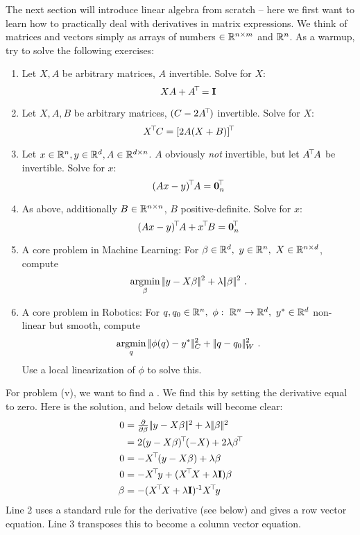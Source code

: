 The next section will introduce linear algebra from scratch -- here we first want to learn how to practically deal with derivatives in matrix expressions. We think of matrices and vectors simply as arrays of numbers $\in {\mathbb{R}}^{n\times m}$ and ${\mathbb{R}}^n$. As a warmup, try to solve the following exercises:
\begin{enumerate}
\item Let $X,A$ be arbitrary matrices, $A$ invertible. Solve for $X$:
\begin{equation}
 X A + A^{\!\top\!} = {\rm\bf I} 
\end{equation}

\item Let $X,A,B$ be arbitrary matrices, $(C-2A^{\!\top\!})$ invertible. Solve for $X$:
\begin{equation}
 X^{\!\top\!} C = [2 A (X + B)]^{\!\top\!} 
\end{equation}

\item Let $x\in{\mathbb{R}}^n,y\in{\mathbb{R}}^d,A\in{\mathbb{R}}^{d\times n}$. $A$ obviously \emph{not}
invertible, but let $A^{\!\top\!} A$ be invertible. Solve for $x$:
\begin{equation}
 (A x - y)^{\!\top\!} A = \boldsymbol 0_n^{\!\top\!} 
\end{equation}

\item As above, additionally $B\in{\mathbb{R}}^{n\times n}$, $B$
positive-definite. Solve for $x$: 
\begin{equation}
 (A x - y)^{\!\top\!} A + x^{\!\top\!} B = \boldsymbol 0_n^{\!\top\!} 
\end{equation}

\item A core problem in Machine Learning: For $\beta\in{\mathbb{R}}^d,~ y\in{\mathbb{R}}^n,~ X
\in{\mathbb{R}}^{n\times d}$, compute
\begin{equation}
\operatorname*{argmin}_\beta |\!|y - X \beta|\!|^2 + \lambda |\!|\beta|\!|^2 ~.
\end{equation}

\item A core problem in Robotics: For
$q,q_0\in{\mathbb{R}}^n,~ \phi:~ {\mathbb{R}}^n \to {\mathbb{R}}^d,~ y^*\in{\mathbb{R}}^d$ non-linear but
smooth, compute
\begin{equation}
\operatorname*{argmin}_q |\!|\phi(q) - y^*|\!|^2_C + |\!|q-q_0|\!|_W^2 ~.
\end{equation}
Use a local linearization of $\phi$ to solve this.
\end{enumerate}

For problem (v), we want to find a . We find this by setting the derivative equal to zero. Here is the solution, and below details will become clear:
\begin{align}
0 &= \Del{\b} \norm{y - X \b}^2 + \l \norm{\b}^2 \\
&= 2 (y - X\b)^\T (-X) + 2 \l \b^\T \\
0 &= - X^\T (y - X\b) + \l \b \\
0 &= - X^\T y + (X^\T X + \l \Id) \b \\
\b &= - (X^\T X + \l \Id)^\1 X^\T y
\end{align}
Line 2 uses a standard rule for the derivative (see below) and gives a
row vector equation. Line 3 transposes this to become a column vector
equation.


